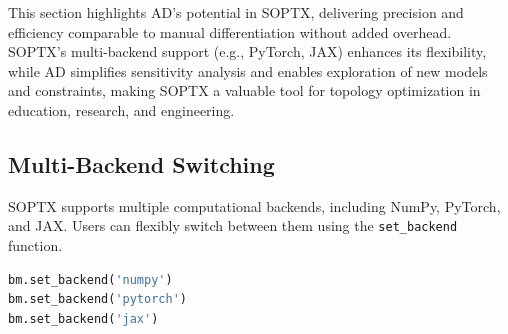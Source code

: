 \documentclass[mathpazo]{cicp}
\begin{document}
This section highlights AD’s potential in SOPTX, delivering precision and efficiency comparable to manual differentiation without added overhead. SOPTX’s multi-backend support (e.g., PyTorch, JAX) enhances its flexibility, while AD simplifies sensitivity analysis and enables exploration of new models and constraints, making SOPTX a valuable tool for topology optimization in education, research, and engineering.

\subsection{Multi-Backend Switching}\label{sec:exp_multi_backend}
SOPTX supports multiple computational backends, including NumPy, PyTorch, and JAX. Users can flexibly switch between them using the \texttt{set\_backend} function.
\vspace{-0.5ex} %
\begin{lstlisting}[language=python]
bm.set_backend('numpy')    
bm.set_backend('pytorch') 
bm.set_backend('jax')     
\end{lstlisting}
\vspace{-0.5ex} %
\end{document}
